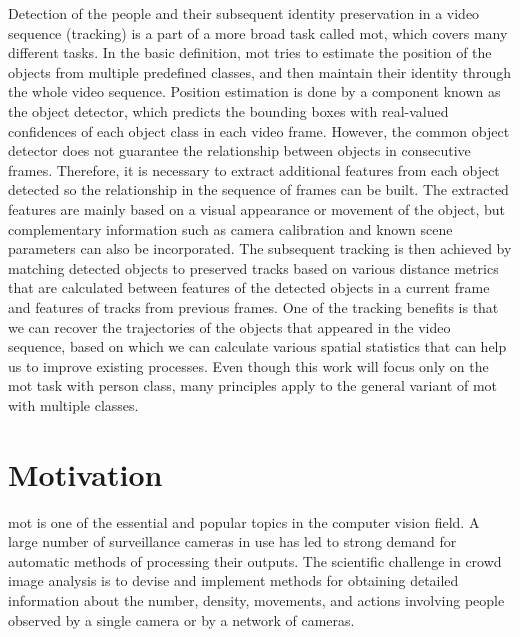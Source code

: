 \begin{introduction}
Detection of the people and their subsequent identity preservation in a video sequence (tracking) is a part of a more broad task called \gls{mot}, which covers many different tasks. In the basic definition, \gls{mot} tries to estimate the position of the objects from multiple predefined classes, and then maintain their identity through the whole video sequence. Position estimation is done by a component known as the object detector, which predicts the bounding boxes with real-valued confidences of each object class in each video frame. However, the common object detector does not guarantee the relationship between objects in consecutive frames. Therefore, it is necessary to extract additional features from each object detected so the relationship in the sequence of frames can be built. The extracted features are mainly based on a visual appearance or movement of the object, but complementary information such as camera calibration and known scene parameters can also be incorporated. The subsequent tracking is then achieved by matching detected objects to preserved tracks based on various distance metrics that are calculated between features of the detected objects in a current frame and features of tracks from previous frames. One of the tracking benefits is that we can recover the trajectories of the objects that appeared in the video sequence, based on which we can calculate various spatial statistics that can help us to improve existing processes. Even though this work will focus only on the \gls{mot} task with person class, many principles apply to the general variant of \gls{mot} with multiple classes.

\section{Motivation}
    \gls{mot} is one of the essential and popular topics in the computer vision field. A large number of surveillance cameras in use has led to strong demand for automatic methods of processing their outputs. The scientific challenge in crowd image analysis is to devise and implement methods for obtaining detailed information about the number, density, movements, and actions involving people observed by a single camera or by a network of cameras.  
    

\end{introduction}
